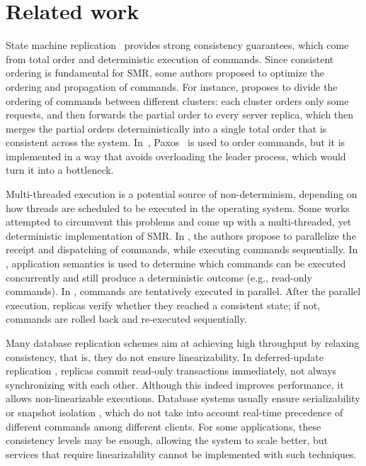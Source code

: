 \section{Related work}
\label{sec:rw}

State machine replication~\cite{Kapritsos:2012um, kotla2004htbft, Lam78, santos2013htsmr, Sch90} provides strong consistency guarantees, which come from total order and deterministic execution of commands.
Since consistent ordering is fundamental for SMR, some authors proposed to optimize the ordering and propagation of commands.
For instance, \cite{kapritsos2010scalable} proposes to divide the ordering of commands between different clusters: each cluster orders only some requests, and then forwards the partial order to every server replica, which then merges the partial orders deterministically into a single total order that is consistent across the system.
In~\cite{biely2012spaxos}, Paxos~\cite{Lamport:1998ea} is used to order commands, but it is implemented in a way that avoids overloading the leader process, which would turn it into a bottleneck.

Multi-threaded execution is a potential source of non-determinism, depending on how threads are scheduled to be executed in the operating system.
Some works attempted to circumvent this problems and come up with a multi-threaded, yet deterministic implementation of SMR.
In \cite{santos2013htsmr}, the authors propose to parallelize the receipt and dispatching of commands, while executing commands sequentially.
In \cite{kotla2004htbft}, application semantics is used to determine which commands can be executed concurrently and still produce a deterministic outcome (e.g., read-only commands).
In \cite{Kapritsos:2012um}, commands are tentatively executed in parallel.
After the parallel execution, replicas verify whether they reached a consistent state; if not, commands are rolled back and re-executed sequentially.

Many database replication schemes aim at achieving high throughput by relaxing consistency, that is, they do not ensure linearizability.
In deferred-update replication \cite{chundi96dur, kobus2013hybrid, sciascia2012sdur, SousaOMP01}, replicas commit read-only transactions immediately, not always synchronizing with each other.
Although this indeed improves performance, it allows non-linearizable executions.
Database systems usually ensure serializability \cite{BHG87} or snapshot isolation \cite{LinKJPA09}, which do not take into account real-time precedence of different commands among different clients. 
For some applications, these consistency levels may be enough, allowing the system to scale better, but services that require linearizability cannot be implemented with such techniques.

